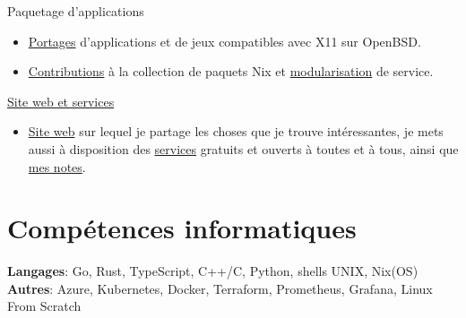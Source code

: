 \documentclass[margin,line]{../res}
\begin{document}
\begin{resume}

	Paquetage d'applications
	\begin{itemize}
		\item \href{https://github.com/theobori/openbsd-ports}{Portages} d'applications et de jeux compatibles avec X11 sur OpenBSD.
		\item \href{https://repology.org/maintainer/theo1.bori@epitech.eu}{Contributions} à la collection de paquets Nix et \href{https://github.com/theobori/nix-teeworlds}{modularisation} de service.
	\end{itemize}

	\href{https://github.com/theobori-cafe}{Site web et services}
	\begin{itemize}
		\item \href{https://theobori.cafe}{Site web} sur lequel je partage les choses que je trouve intéressantes, je mets aussi à disposition des \href{https://services.theobori.cafe}{services} gratuits et ouverts à toutes et à tous, ainsi que \href{https://zettel.theobori.cafe}{mes notes}.
	\end{itemize}

	\section{\sc Compétences informatiques}
	\textbf{Langages}: Go, Rust, TypeScript, C++/C, Python, shells UNIX, Nix(OS)\\
	\textbf{Autres}: Azure, Kubernetes, Docker, Terraform, Prometheus, Grafana, Linux From Scratch

\end{resume}
\end{document}
